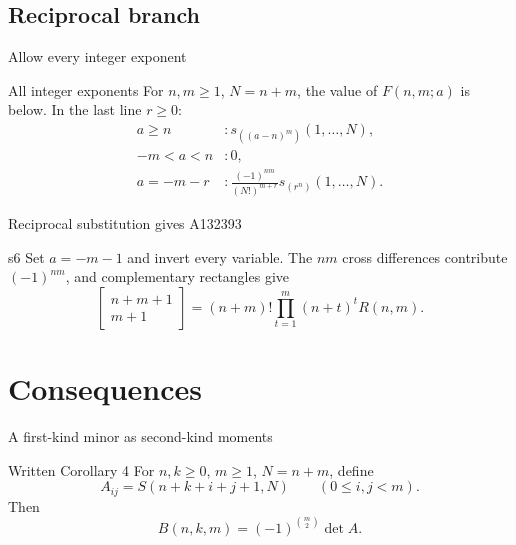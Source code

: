 \documentclass{beamer}
\begin{document}
\subsection{Reciprocal branch}
\begin{frame}{Allow every integer exponent}
  \begin{block}{All integer exponents}
    For $n,m\ge1$, $N=n+m$, the value of $F(n,m;a)$ is below. In the last line $r\ge0$:
    \[
    \begin{aligned}
    a\ge n &: s_{((a-n)^m)}(1,\ldots,N),\\
    -m<a<n &: 0,\\
    a=-m-r &: \frac{(-1)^{nm}}{(N!)^{m+r}}s_{(r^n)}(1,\ldots,N).
    \end{aligned}
    \]
  \end{block}
\end{frame}
\begin{frame}{Reciprocal substitution gives A132393}
  \begin{bookresult}{s6}
    Set $a=-m-1$ and invert every variable. The $nm$ cross differences contribute $(-1)^{nm}$, and complementary rectangles give
    \[
      \left[\begin{matrix}n+m+1\\m+1\end{matrix}\right]
      =(n+m)!\prod_{t=1}^{m}(n+t)^tR(n,m).
    \]
  \end{bookresult}
\end{frame}
\section{Consequences}
\begin{frame}{A first-kind minor as second-kind moments}
  \begin{block}{Written Corollary 4}
    For $n,k\ge0$, $m\ge1$, $N=n+m$, define
    \[ A_{ij}=S(n+k+i+j+1,N)\qquad(0\le i,j<m). \]
    Then
    \[ B(n,k,m)=(-1)^{\binom m2}\det A. \]
  \end{block}
\end{frame}
\end{document}
